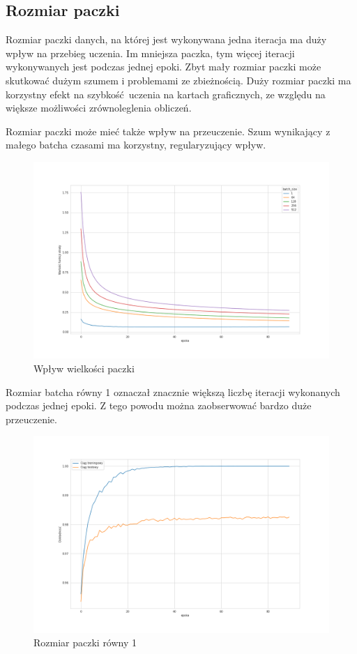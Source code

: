\documentclass{article}
\begin{document}
\subsection{Rozmiar paczki}
Rozmiar paczki danych, na której jest wykonywana jedna iteracja ma duży wpływ na przebieg uczenia.
Im mniejsza paczka, tym więcej iteracji wykonywanych jest podczas jednej epoki.
Zbyt mały rozmiar paczki może skutkować dużym szumem i problemami ze zbieżnością.
Duży rozmiar paczki ma korzystny efekt na szybkość uczenia na kartach graficznych, ze względu na większe możliwości zrównoleglenia obliczeń.

Rozmiar paczki może mieć także wpływ na przeuczenie.
Szum wynikający z małego batcha czasami ma korzystny, regularyzujący wpływ.

\begin{figure}[H]
  \centering
  \includegraphics[width=\textwidth]{images/batch_size_comp.png}
  \caption{Wpływ wielkości paczki}
\end{figure}

Rozmiar batcha równy 1 oznaczał znacznie większą liczbę iteracji wykonanych podczas jednej epoki.
Z tego powodu można zaobserwować bardzo duże przeuczenie.

\begin{figure}[H]
  \centering
  \includegraphics[width=\textwidth]{images/batch_size_accuracy.png}
  \caption{Rozmiar paczki równy 1}
\end{figure}
\end{document}
